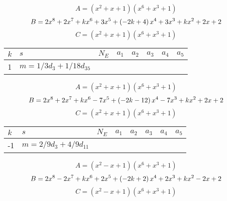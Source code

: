 \documentclass{amsart}
\begin{document}
$$A=(x^2
 + x
 + 1)(x^6
 + x^3
 + 1)$$
$$B=2\*x^8
 + 2\*x^7
 + k\*x^6
 + 3\*x^5
 + \left(-2\*k
 + 4\right) \*x^4
 + 3\*x^3
 + k\*x^2
 + 2\*x
 + 2$$
$$C=(x^2
 + x
 + 1)(x^6
 + x^3
 + 1)$$
\begin{longtable}{|l|l|l|lllll|}
\hline
$k$ & $s$ & $N_E$ & $a_1$ & $a_2$ & $a_3$ & $a_4$ & $a_5$\\
\hline
1&$m=1/3d_{3}+1/18d_{35}$&&\multicolumn{5}{c|}{}\\
\hline
\end{longtable}
$$A=(x^2
 + x
 + 1)(x^6
 + x^3
 + 1)$$
$$B=2\*x^8
 + 2\*x^7
 + k\*x^6
 - 7\*x^5
 + \left(-2\*k
 - 12\right) \*x^4
 - 7\*x^3
 + k\*x^2
 + 2\*x
 + 2$$
$$C=(x^2
 + x
 + 1)(x^6
 + x^3
 + 1)$$
\begin{longtable}{|l|l|l|lllll|}
\hline
$k$ & $s$ & $N_E$ & $a_1$ & $a_2$ & $a_3$ & $a_4$ & $a_5$\\
\hline
-1&$m=2/9d_{3}+4/9d_{11}$&&\multicolumn{5}{c|}{}\\
\hline
\end{longtable}
$$A=(x^2
 - x
 + 1)(x^6
 + x^3
 + 1)$$
$$B=2\*x^8
 - 2\*x^7
 + k\*x^6
 + 2\*x^5
 + \left(-2\*k
 + 2\right) \*x^4
 + 2\*x^3
 + k\*x^2
 - 2\*x
 + 2$$
$$C=(x^2
 - x
 + 1)(x^6
 + x^3
 + 1)$$
\end{document}
